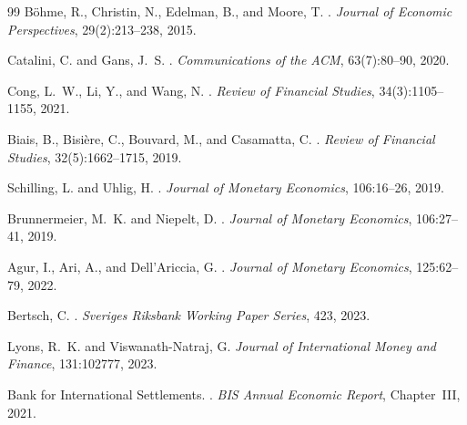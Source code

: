\documentclass{article}
\begin{document}
\begin{thebibliography}{99}
B\"{o}hme, R., Christin, N., Edelman, B., and Moore, T.
.
\newblock \emph{Journal of Economic Perspectives}, 29(2):213--238, 2015.

Catalini, C. and Gans, J.~S.
.
\newblock \emph{Communications of the ACM}, 63(7):80--90, 2020.

Cong, L.~W., Li, Y., and Wang, N.
.
\newblock \emph{Review of Financial Studies}, 34(3):1105--1155, 2021.

Biais, B., Bisière, C., Bouvard, M., and Casamatta, C.
.
\newblock \emph{Review of Financial Studies}, 32(5):1662--1715, 2019.

Schilling, L. and Uhlig, H.
.
\newblock \emph{Journal of Monetary Economics}, 106:16--26, 2019.

Brunnermeier, M.~K. and Niepelt, D.
.
\newblock \emph{Journal of Monetary Economics}, 106:27--41, 2019.

Agur, I., Ari, A., and Dell'Ariccia, G.
.
\newblock \emph{Journal of Monetary Economics}, 125:62--79, 2022.

Bertsch, C.
.
\newblock \emph{Sveriges Riksbank Working Paper Series}, 423, 2023.

Lyons, R.~K. and Viswanath-Natraj, G.
\newblock \emph{Journal of International Money and Finance}, 131:102777, 2023.

Bank for International Settlements.
.
\newblock \emph{BIS Annual Economic Report}, Chapter~III, 2021.

\end{thebibliography}
\end{document}
